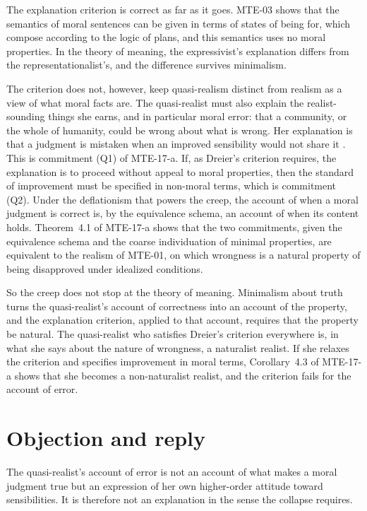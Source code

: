 \documentclass{situationist-preprint}
\begin{document}
The explanation criterion is correct as far as it goes. MTE-03 shows that the semantics of moral sentences can be given in terms of states of being for, which compose according to the logic of plans, and this semantics uses no moral properties. In the theory of meaning, the expressivist's explanation differs from the representationalist's, and the difference survives minimalism.

The criterion does not, however, keep quasi-realism distinct from realism as a view of what moral facts are. The quasi-realist must also explain the realist-sounding things she earns, and in particular moral error: that a community, or the whole of humanity, could be wrong about what is wrong. Her explanation is that a judgment is mistaken when an improved sensibility would not share it \citep{Blackburn1998}. This is commitment (Q1) of MTE-17-a. If, as Dreier's criterion requires, the explanation is to proceed without appeal to moral properties, then the standard of improvement must be specified in non-moral terms, which is commitment (Q2). Under the deflationism that powers the creep, the account of when a moral judgment is correct is, by the equivalence schema, an account of when its content holds. Theorem~4.1 of MTE-17-a shows that the two commitments, given the equivalence schema and the coarse individuation of minimal properties, are equivalent to the realism of MTE-01, on which wrongness is a natural property of being disapproved under idealized conditions.

So the creep does not stop at the theory of meaning. Minimalism about truth turns the quasi-realist's account of correctness into an account of the property, and the explanation criterion, applied to that account, requires that the property be natural. The quasi-realist who satisfies Dreier's criterion everywhere is, in what she says about the nature of wrongness, a naturalist realist. If she relaxes the criterion and specifies improvement in moral terms, Corollary~4.3 of MTE-17-a shows that she becomes a non-naturalist realist, and the criterion fails for the account of error.

\section{Objection and reply}

\begin{objection}
The quasi-realist's account of error is not an account of what makes a moral judgment true but an expression of her own higher-order attitude toward sensibilities. It is therefore not an explanation in the sense the collapse requires.
\end{objection}
\end{document}
